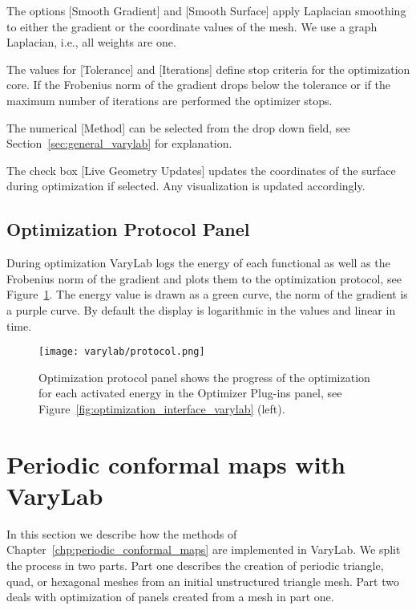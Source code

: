 \documentclass[Thesis.tex]{subfiles}
\begin{document}
The options [Smooth Gradient] and [Smooth Surface] apply Laplacian smoothing to either the gradient or the coordinate values of the mesh. We use a graph Laplacian, i.e., all weights are one.

The values for [Tolerance] and [Iterations] define stop criteria for the optimization core. If the Frobenius norm of the gradient drops below the tolerance or if the maximum number of iterations are performed the optimizer stops. 

The numerical [Method] can be selected from the drop down field, see Section~\ref{sec:general_varylab} for explanation.

The check box [Live Geometry Updates] updates the coordinates of the surface during optimization if selected. Any visualization is updated accordingly.

\subsection*{Optimization Protocol Panel}

During optimization {\sc VaryLab} logs the energy of each functional as well as the Frobenius norm of the gradient and plots them to the optimization protocol, see Figure~\ref{fig:protocol_interface_varylab}. The energy value is drawn as a green curve, the norm of the gradient is a purple curve. By default the display is logarithmic in the values and linear in time.

\begin{figure}
\begin{center}
\texttt{[image: varylab/protocol.png]}
\caption{Optimization protocol panel shows the progress of the optimization for each activated energy in the Optimizer Plug-ins panel, see Figure~\ref{fig:optimization_interface_varylab} (left).}
\label{fig:protocol_interface_varylab}
\end{center}
\end{figure}

\section{Periodic conformal maps with {\sc VaryLab}}
\label{sec:periodic_varylab}
In this section we describe how the methods of Chapter~\ref{chp:periodic_conformal_maps} are implemented in {\sc VaryLab}. We split the process in two parts. Part one describes the creation of periodic triangle, quad, or hexagonal meshes from an initial unstructured triangle mesh. Part two deals with optimization of panels created from a mesh in part one.
\end{document}
